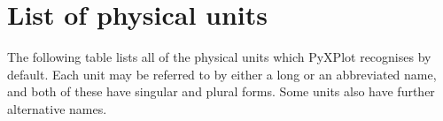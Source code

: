 %
%
%
%
%



\chapter{List of physical units}
\label{ch:unit_list}

The following table lists all of the physical units which PyXPlot recognises by
default. Each unit may be referred to by either a long or an abbreviated name,
and both of these have singular and plural forms. Some units also have further
alternative names.

